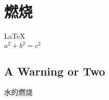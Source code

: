 \documentclass[UTF8]{article}
\begin{document}
       
 
\section{燃烧}          
\LaTeX \,\\ 
 $a^2+b^2=c^2$
 
\subsection{A Warning or Two}  

水的燃烧
\end{document}
